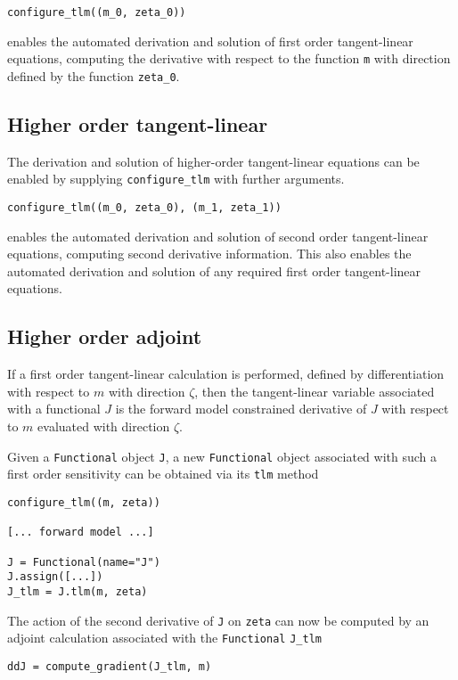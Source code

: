 \documentclass[11pt]{article}
\begin{document}
\begin{lstlisting}
configure_tlm((m_0, zeta_0))
\end{lstlisting}
enables the automated derivation and solution of first order tangent-linear
equations, computing the derivative with respect to the function \texttt{m}
with direction defined by the function \texttt{zeta\_0}.

\subsection{Higher order tangent-linear}

The derivation and solution of higher-order tangent-linear equations can be
enabled by supplying \texttt{configure\_tlm} with further arguments.

\begin{lstlisting}
configure_tlm((m_0, zeta_0), (m_1, zeta_1))
\end{lstlisting}
enables the automated derivation and solution of second order tangent-linear
equations, computing second derivative information. This also enables the
automated derivation and solution of any required first order tangent-linear
equations.

\subsection{Higher order adjoint}\label{sect:higher_order_adjoint}

If a first order tangent-linear calculation is performed, defined by
differentiation with respect to $m$ with direction $\zeta$, then the
tangent-linear variable associated with a functional $J$ is the forward model
constrained derivative of $J$ with respect to $m$ evaluated with direction
$\zeta$.

Given a \texttt{Functional} object \texttt{J}, a new \texttt{Functional} object
associated with such a first order sensitivity can be obtained via its
\texttt{tlm} method
\begin{lstlisting}
configure_tlm((m, zeta))

[... forward model ...]

J = Functional(name="J")
J.assign([...])
J_tlm = J.tlm(m, zeta)
\end{lstlisting}
The action of the second derivative of \texttt{J} on \texttt{zeta} can now be
computed by an adjoint calculation associated with the \texttt{Functional}
\texttt{J\_tlm}
\begin{lstlisting}
ddJ = compute_gradient(J_tlm, m)
\end{lstlisting}
\end{document}
